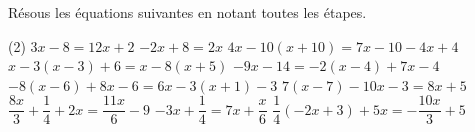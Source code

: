 %
%
    Résous les équations suivantes en notant toutes les étapes.
    \begin{tasks}(2)
        \task $3x-8=12x+2$
        \task $-2x+8=2x$
        \task $4x-10(x+10)=7x-10-4x+4$%
        \task $x-3(x-3)+6=x-8(x+5)$
        \task $-9 x-14=-2 (x-4)+7 x-4$
        \task $-8(x-6)+8 x-6=6 x-3(x+1)-3$
        \task $7 (x-7)-10 x-3=8 x+5$
        \task $\dfrac{8 x}{3}+\dfrac{1}{4}+2x=\dfrac{11 x}{6}-9$
        \task $-3 x+\dfrac{1}{4}=7 x+\dfrac{x}{6}$
        \task $\dfrac{1}{4} (-2 x+3)+5x=-\dfrac{10 x}{3}+5$
    \end{tasks}
